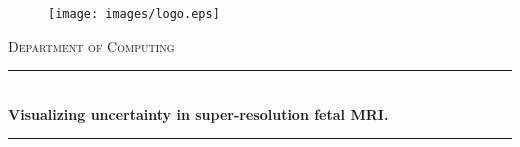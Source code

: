 
\begin{titlepage}

\newcommand{\HRule}{\rule{\linewidth}{0.3mm}} %


\begin{figure}
  \begin{flushleft}%
	\texttt{[image: images/logo.eps]}\\[2cm] %
  \end{flushleft}
\end{figure}

\center %
 

\textsc{\Large Department of Computing}\\[0.5cm] %


\HRule \\[0.4cm]
{ \LARGE \bfseries Visualizing uncertainty in super-resolution fetal MRI.}\\[0cm] %
\HRule \\[1.5cm]
 


\end{titlepage}
